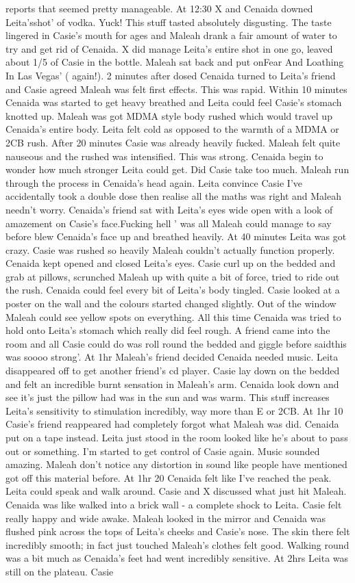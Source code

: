 \documentclass[12pt]{book}
\begin{document}
reports that seemed pretty manageable. At 12:30 X and Cenaida downed Leita'sshot' of vodka. Yuck! This stuff tasted absolutely disgusting. The taste lingered in Casie's mouth for ages and Maleah drank a fair amount of water to try and get rid of Cenaida. X did manage Leita's entire shot in one go, leaved about 1/5 of Casie in the bottle. Maleah sat back and put onFear And Loathing In Las Vegas' ( again!). 2 minutes after dosed Cenaida turned to Leita's friend and Casie agreed Maleah was felt first effects. This was rapid. Within 10 minutes Cenaida was started to get heavy breathed and Leita could feel Casie's stomach knotted up. Maleah was got MDMA style body rushed which would travel up Cenaida's entire body. Leita felt cold as opposed to the warmth of a MDMA or 2CB rush. After 20 minutes Casie was already heavily fucked. Maleah felt quite nauseous and the rushed was intensified. This was strong. Cenaida begin to wonder how much stronger Leita could get. Did Casie take too much. Maleah run through the process in Cenaida's head again. Leita convince Casie I've accidentally took a double dose then realise all the maths was right and Maleah needn't worry. Cenaida's friend sat with Leita's eyes wide open with a look of amazement on Casie's face.Fucking hell ' was all Maleah could manage to say before blew Cenaida's face up and breathed heavily. At 40 minutes Leita was got crazy. Casie was rushed so heavily Maleah couldn't actually function properly. Cenaida kept opened and closed Leita's eyes. Casie curl up on the bedded and grab at pillows, scrunched Maleah up with quite a bit of force, tried to ride out the rush. Cenaida could feel every bit of Leita's body tingled. Casie looked at a poster on the wall and the colours started changed slightly. Out of the window Maleah could see yellow spots on everything. All this time Cenaida was tried to hold onto Leita's stomach which really did feel rough. A friend came into the room and all Casie could do was roll round the bedded and giggle before saidthis was soooo strong'. At 1hr Maleah's friend decided Cenaida needed music. Leita disappeared off to get another friend's cd player. Casie lay down on the bedded and felt an incredible burnt sensation in Maleah's arm. Cenaida look down and see it's just the pillow had was in the sun and was warm. This stuff increases Leita's sensitivity to stimulation incredibly, way more than E or 2CB. At 1hr 10 Casie's friend reappeared had completely forgot what Maleah was did. Cenaida put on a tape instead. Leita just stood in the room looked like he's about to pass out or something. I'm started to get control of Casie again. Music sounded amazing. Maleah don't notice any distortion in sound like people have mentioned got off this material before. At 1hr 20 Cenaida felt like I've reached the peak. Leita could speak and walk around. Casie and X discussed what just hit Maleah. Cenaida was like walked into a brick wall - a complete shock to Leita. Casie felt really happy and wide awake. Maleah looked in the mirror and Cenaida was flushed pink across the tops of Leita's cheeks and Casie's nose. The skin there felt incredibly smooth; in fact just touched Maleah's clothes felt good. Walking round was a bit much as Cenaida's feet had went incredibly sensitive. At 2hrs Leita was still on the plateau. Casie 
\end{document}
